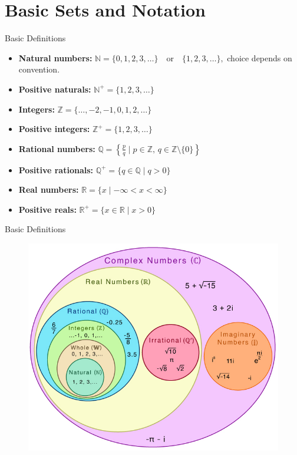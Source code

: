 
\graphicspath{{./images/png}{./images/png/lecture-01}}
\date{13 October 2025}



\begin{frame}
  \cmctitleframe
\end{frame}

\section{Basic Sets and Notation}

\begin{frame}{Basic Definitions}
\begin{itemize}
  \item \textbf{Natural numbers:}
     $\mathbb{N} = \{0,1,2,3,\dots\} \quad\text{or}\quad \{1,2,3,\dots\},$ choice depends on convention.
  \item \textbf{Positive naturals:}  $\mathbb{N}^{+} = \{1,2,3,\dots\}$
  \item \textbf{Integers:} $\mathbb{Z} = \{\dots,-2,-1,0,1,2,\dots\}$
  \item \textbf{Positive integers:}  $\mathbb{Z}^{+} = \{1,2,3,\dots\}$
  \item \textbf{Rational numbers:} $\mathbb{Q} = \left\{ \frac{p}{q} \mid p \in \mathbb{Z},\, q \in \mathbb{Z}\setminus\{0\} \right\}$
  \item \textbf{Positive rationals:} $\mathbb{Q}^{+} = \{q \in \mathbb{Q} \mid q > 0\}$
  \item \textbf{Real numbers:} $\mathbb{R} = \{ x \mid -\infty < x < \infty \}$
  \item \textbf{Positive reals:} $\mathbb{R}^{+} = \{ x \in \mathbb{R} \mid x > 0\}$
\end{itemize}
\end{frame}

\begin{frame}{Basic Definitions}
\begin{figure}
    \centering
    \includegraphics[width=0.7\linewidth]{Number-Sets-Venn-Diagram.png}
\end{figure}

\end{frame}


